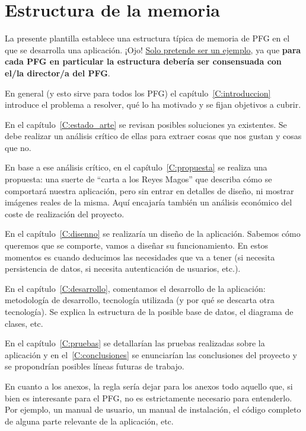 \section{Estructura de la memoria}

La presente plantilla establece una estructura típica de memoria de PFG en el que se desarrolla una aplicación. ¡Ojo! \underline{Solo pretende ser un ejemplo}, ya que \textbf{para cada PFG en particular la estructura debería ser consensuada con el/la director/a del PFG}.

En general (y esto sirve para todos los PFG) el capítulo~\ref{C:introduccion} introduce el problema a resolver, qué lo ha motivado y se fijan objetivos a cubrir.

En el capítulo~\ref{C:estado_arte} se revisan posibles soluciones ya existentes. Se debe realizar un análisis crítico de ellas para extraer cosas que nos gustan y cosas que no.

En base a ese análisis crítico, en el capítulo~\ref{C:propuesta} se realiza una propuesta: una suerte de ``carta a los Reyes Magos'' que describa cómo se comportará nuestra aplicación, pero sin entrar en detalles de diseño, ni mostrar imágenes reales de la misma. Aquí encajaría también un análisis económico del coste de realización del proyecto.

En el capítulo~\ref{C:disenno} se realizaría un diseño de la aplicación. Sabemos cómo queremos que se comporte, vamos a diseñar su funcionamiento. En estos momentos es cuando deducimos las necesidades que va a tener (si necesita persistencia de datos, si necesita autenticación de usuarios, etc.).

En el capítulo~\ref{C:desarrollo}, comentamos el desarrollo de la aplicación: metodología de desarrollo, tecnología utilizada (y por qué se descarta otra tecnología). Se explica la estructura de la posible base de datos, el diagrama de clases, etc.

En el capítulo~\ref{C:pruebas} se detallarían las pruebas realizadas sobre la aplicación y en el~\ref{C:conclusiones} se enunciarían las conclusiones del proyecto y se propondrían posibles líneas futuras de trabajo.

En cuanto a los anexos, la regla sería dejar para los anexos todo aquello que, si bien es interesante para el PFG, no es estrictamente necesario para entenderlo. Por ejemplo, un manual de usuario, un manual de instalación, el código completo de alguna parte relevante de la aplicación, etc.
